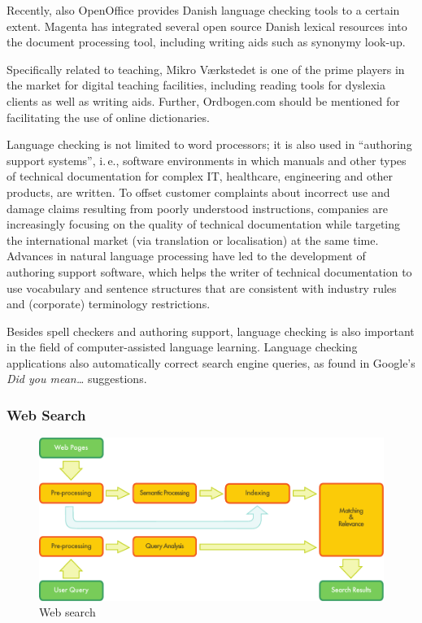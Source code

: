 \documentclass[]{../../metanetpaper}
\begin{document}
\begin{multicols}{2}
Recently, also OpenOffice provides Danish language checking tools to a certain extent. Magenta  has integrated several open source Danish lexical resources into the document processing tool, including writing aids such as synonymy look-up. 

Specifically related to teaching, Mikro V\ae rk\-stedet is one of the prime players in the market for digital teaching facilities, including reading tools for dyslexia clients as well as writing aids. Further, Ordbogen.com should be mentioned for facilitating the use of online dictionaries.  

Language checking is not limited to word processors; it is also used in “authoring support systems”, i.\,e., software environments in which manuals and other types of technical documentation for complex IT, healthcare, engineering and other products, are written. To offset customer complaints about incorrect use and damage claims resulting from poorly understood instructions, companies are increasingly focusing on the quality of technical documentation while targeting the international market (via translation or localisation) at the same time. Advances in natural language processing have led to the development of authoring support software, which helps the writer of technical documentation to use vocabulary and sentence structures that are consistent with industry rules and (corporate) terminology restrictions.


Besides spell checkers and authoring support, language checking is also important in the field of computer-assisted language learning. Language checking applications also automatically correct search engine queries, as found in Google's \textit{Did you mean…} suggestions.

\subsubsection{Web Search}

\begin{figure}[htb]
  \center
  \includegraphics[width=\textwidth]{../_media/english/web_search_architecture}
  \caption{Web search}
  \label{fig:websearcharch_en}
 \end{figure}


\end{multicols}
\end{document}
